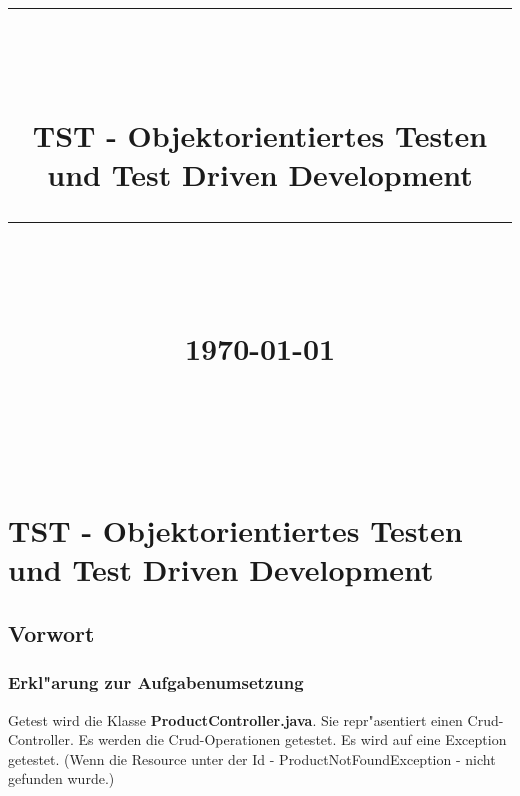 \documentclass[12pt]{article}
\newcommand{\HRule}[1]{\rule{\linewidth}{#1}}
\begin{document}
\hypersetup{
    citecolor=black,
    filecolor=black,
    linkcolor=black,
    urlcolor=black
}


\title{ \normalsize
		\HRule{0.5pt} \\
		\LARGE \textbf{\uppercase{\newCommandDiscipline}} \\
    \smallbreak
    \small\textbf{{TST - Objektorientiertes Testen und Test Driven Development}}\\
		\HRule{2pt} \\ [0.5cm]
    \small\textbf{{\newCommandTerm}}\\
    [0.5cm]
    \normalsize \today \vspace*{10\baselineskip}}

\date{}



\author{
    \newCommandName \\
		\newCommandMatriculationNumber \\
		\newCommandUniversity \\
		\newCommandFaculty
}


\maketitle
\thispagestyle{empty}

\newpage
\pagestyle{myfancy}
\tableofcontents
\newpage

\sectionfont{\scshape}

\section{TST - Objektorientiertes Testen und Test Driven Development}
\subsection{Vorwort}
\subsubsection{Erkl"arung zur Aufgabenumsetzung}
Getest wird die Klasse \textbf{ProductController.java}.
Sie repr"asentiert einen Crud-Controller. Es werden die Crud-Operationen getestet. Es wird auf eine Exception getestet. (Wenn die Resource unter der Id - ProductNotFoundException - nicht gefunden wurde.)
\end{document}

